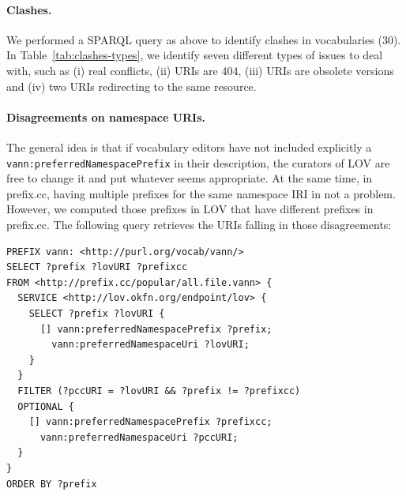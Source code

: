 \paragraph{Clashes.} We performed a SPARQL query as above to identify clashes in vocabularies ($30$). In Table~\ref{tab:clashes-types}, we identify seven different types of issues to deal with, such as (i) real conflicts, (ii) URIs are 404, (iii) URIs are obsolete versions and (iv) two URIs redirecting to the same resource.
\begin{table}
\end{table}

\paragraph{Disagreements on namespace URIs.} The general idea is that if vocabulary editors have not included explicitly a \\ \texttt{vann:preferredNamespacePrefix} in their description, the curators of LOV are free to change it and put whatever seems appropriate. At the same time, in prefix.cc, having multiple prefixes for the same namespace IRI in not a problem. However, we computed those prefixes in LOV that have different prefixes in prefix.cc. The following query retrieves the URIs falling in those disagreements:

\begin{lstlisting}
PREFIX vann: <http://purl.org/vocab/vann/>
SELECT ?prefix ?lovURI ?prefixcc
FROM <http://prefix.cc/popular/all.file.vann> {
  SERVICE <http://lov.okfn.org/endpoint/lov> {
    SELECT ?prefix ?lovURI {
      [] vann:preferredNamespacePrefix ?prefix;
        vann:preferredNamespaceUri ?lovURI;
    }
  }
  FILTER (?pccURI = ?lovURI && ?prefix != ?prefixcc)
  OPTIONAL {
    [] vann:preferredNamespacePrefix ?prefixcc;
      vann:preferredNamespaceUri ?pccURI;
  }
}
ORDER BY ?prefix
\end{lstlisting}

